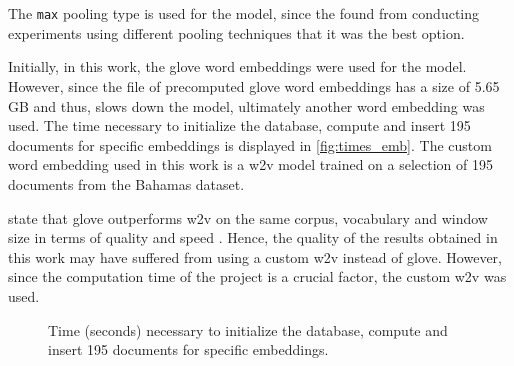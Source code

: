 \section{\infersent{}}\label{sec:evaluation-inferSent}

The \texttt{max} pooling type is used for the \infersent{} model, since the \citeauthor{inferSent2018} 
found from conducting experiments using different pooling techniques
that it was the best option.

Initially, in this work, the \ac{glove} word embeddings were used for the \infersent{} model.
However, since the file of precomputed \acs{glove} word embeddings has a size of 5.65 GB and thus,
slows down the model, ultimately another word embedding was used.
The time necessary to initialize the database, compute and insert 195 documents for specific embeddings is displayed in \autoref{fig:times_emb}.
The custom word embedding used in this work is a \ac{w2v} model trained on a selection of 195 documents from the Bahamas dataset.

\citeauthor{glove2014} state that \acs{glove} outperforms \ac{w2v} on the same corpus, 
vocabulary and window size in terms of quality and speed \cite{glove2014}.
Hence, the quality of the results obtained in this work may have suffered from using a custom \ac{w2v} instead of \acs{glove}.
However, since the computation time of the project is a crucial factor, the custom \ac{w2v} was used.

\begin{figure}%
    \centering
    \qquad
    \caption{Time (seconds) necessary to initialize the database, compute and insert 195 documents for specific embeddings.}%
    \label{fig:times_emb}%
\end{figure}

